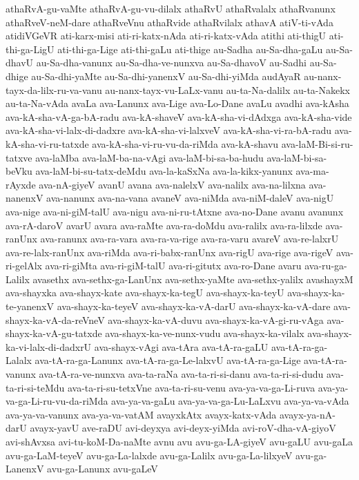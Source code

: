 {athaRvA-gu-vaMte
athaRvA-gu-vu-dilalx
athaRvU
athaRvalalx
athaRvanunx
athaRveV-neM-dare
athaRveVnu
athaRvide
athaRvilalx
athavA
atiV-ti-vAda
atidiVGeVR
ati-karx-misi
ati-ri-katx-nAda
ati-ri-katx-vAda
atithi
ati-thigU
ati-thi-ga-LigU
ati-thi-ga-Lige
ati-thi-gaLu
ati-thige
au-Sadha
au-Sa-dha-gaLu
au-Sa-dhavU
au-Sa-dha-vanunx
au-Sa-dha-ve-nunxva
au-Sa-dhavoV
au-Sadhi
au-Sa-dhige
au-Sa-dhi-yaMte
au-Sa-dhi-yanenxV
au-Sa-dhi-yiMda
audAyaR
au-nanx-tayx-da-lilx-ru-va-vanu
au-nanx-tayx-vu-LaLx-vanu
au-ta-Na-dalilx
au-ta-Nakekx
au-ta-Na-vAda
avaLa
ava-Lanunx
ava-Lige
ava-Lo-Dane
avaLu
avadhi
ava-kAsha
ava-kA-sha-vA-ga-bA-radu
ava-kA-shaveV
ava-kA-sha-vi-dAdxga
ava-kA-sha-vide
ava-kA-sha-vi-lalx-di-dadxre
ava-kA-sha-vi-lalxveV
ava-kA-sha-vi-ra-bA-radu
ava-kA-sha-vi-ru-tatxde
ava-kA-sha-vi-ru-vu-da-riMda
ava-kA-shavu
ava-laM-Bi-si-ru-tatxve
ava-laMba
ava-laM-ba-na-vAgi
ava-laM-bi-sa-ba-hudu
ava-laM-bi-sa-beVku
ava-laM-bi-su-tatx-deMdu
ava-la-kaSxNa
ava-la-kikx-yanunx
ava-ma-rAyxde
ava-nA-giyeV
avanU
avana
ava-nalelxV
ava-nalilx
ava-na-lilxna
ava-nanenxV
ava-nanunx
ava-na-vana
avaneV
ava-niMda
ava-niM-daleV
ava-nigU
ava-nige
ava-ni-giM-talU
ava-nigu
ava-ni-ru-tAtxne
ava-no-Dane
avanu
avanunx
ava-rA-daroV
avarU
avara
ava-raMte
ava-ra-doMdu
ava-ralilx
ava-ra-lilxde
ava-ranUnx
ava-ranunx
ava-ra-vara
ava-ra-va-rige
ava-ra-varu
avareV
ava-re-lalxrU
ava-re-lalx-ranUnx
ava-riMda
ava-ri-babx-ranUnx
ava-rigU
ava-rige
ava-rigeV
ava-ri-gelAlx
ava-ri-giMta
ava-ri-giM-talU
ava-ri-gitutx
ava-ro-Dane
avaru
ava-ru-ga-Lalilx
avasethx
ava-sethx-ga-LanUnx
ava-sethx-yaMte
ava-sethx-yalilx
avashayxM
ava-shayxka
ava-shayx-kate
ava-shayx-ka-tegU
ava-shayx-ka-teyU
ava-shayx-ka-te-yanenxV
ava-shayx-ka-teyeV
ava-shayx-ka-vA-darU
ava-shayx-ka-vA-dare
ava-shayx-ka-vA-da-reVneV
ava-shayx-ka-vA-duvu
ava-shayx-ka-vA-gi-ru-vAga
ava-shayx-ka-vA-gu-tatxde
ava-shayx-ka-ve-nunx-vudu
ava-shayx-ka-vilalx
ava-shayx-ka-vi-lalx-di-dadxrU
ava-shayx-vAgi
ava-tAra
ava-tA-ra-gaLU
ava-tA-ra-ga-Lalalx
ava-tA-ra-ga-Lanunx
ava-tA-ra-ga-Le-lalxvU
ava-tA-ra-ga-Lige
ava-tA-ra-vanunx
ava-tA-ra-ve-nunxva
ava-ta-raNa
ava-ta-ri-si-danu
ava-ta-ri-si-dudu
ava-ta-ri-si-teMdu
ava-ta-ri-su-tetxVne
ava-ta-ri-su-venu
ava-ya-va-ga-Li-ruva
ava-ya-va-ga-Li-ru-vu-da-riMda
ava-ya-va-gaLu
ava-ya-va-ga-Lu-LaLxvu
ava-ya-va-vAda
ava-ya-va-vanunx
ava-ya-va-vatAM
avayxkAtx
avayx-katx-vAda
avayx-ya-nA-darU
avayx-yavU
ave-raDU
avi-deyxya
avi-deyx-yiMda
avi-roV-dha-vA-giyoV
avi-shAvxsa
avi-tu-koM-Da-naMte
avnu
avu
avu-ga-LA-giyeV
avu-gaLU
avu-gaLa
avu-ga-LaM-teyeV
avu-ga-La-lalxde
avu-ga-Lalilx
avu-ga-La-lilxyeV
avu-ga-LanenxV
avu-ga-Lanunx
avu-gaLeV
}
